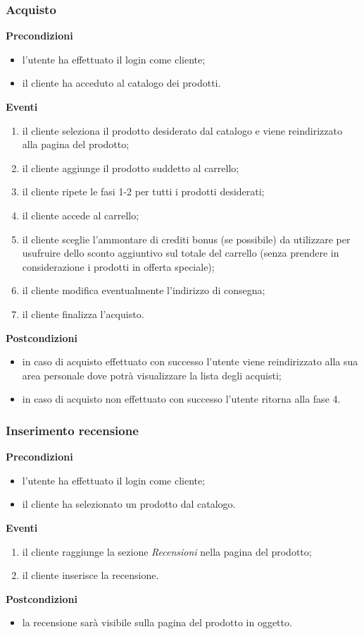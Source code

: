 \documentclass[a4paper, 14pt]{article}
\begin{document}
\begin{flushleft}
			\subsubsection{Acquisto}
			\textbf{Precondizioni}
			\begin{itemize}
				\item l'utente ha effettuato il login come cliente;
				\item il cliente ha acceduto al catalogo dei prodotti.
			\end{itemize}
			\textbf{Eventi}
			\begin{enumerate}
				\item il cliente seleziona il prodotto desiderato dal catalogo e viene reindirizzato alla pagina del prodotto;
				\item il cliente aggiunge il prodotto suddetto al carrello;
				\item il cliente ripete le fasi 1-2 per tutti i prodotti desiderati;
				\item il cliente accede al carrello;
				\item il cliente sceglie l'ammontare di crediti bonus (se possibile) da utilizzare per usufruire dello sconto aggiuntivo
				      sul totale del carrello (senza prendere in considerazione i prodotti in offerta speciale);
				\item il cliente modifica eventualmente l'indirizzo di consegna;
				\item il cliente finalizza l'acquisto.
			\end{enumerate}
			\textbf{Postcondizioni}
			\begin{itemize}
				\item in caso di acquisto effettuato con successo l'utente viene reindirizzato alla sua area personale dove potrà visualizzare la lista degli acquisti;
				\item in caso di acquisto non effettuato con successo l'utente ritorna alla fase 4.
			\end{itemize}
		
			\bigskip
			\subsubsection{Inserimento recensione}
			\textbf{Precondizioni}
			\begin{itemize}
				\item l'utente ha effettuato il login come cliente;
				\item il cliente ha selezionato un prodotto dal catalogo.
			\end{itemize}
			\textbf{Eventi}
			\begin{enumerate}
				\item il cliente raggiunge la sezione \textit{Recensioni} nella pagina del prodotto;
				\item il cliente inserisce la recensione.
			\end{enumerate}
			\textbf{Postcondizioni}
			\begin{itemize}
				\item la recensione sarà visibile sulla pagina del prodotto in oggetto.
			\end{itemize}
			

\end{flushleft}
\end{document}
